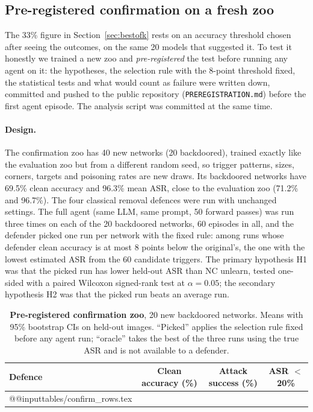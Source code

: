 \documentclass[11pt]{article}
\makeatletter
\newcommand{\tabin}[1]{\csname @@input\endcsname tables/#1 }
\makeatother
\begin{document}
\subsection{Pre-registered confirmation on a fresh zoo}
\label{sec:confirm}
The 33\% figure in Section~\ref{sec:bestofk} rests on an accuracy threshold chosen after seeing the
outcomes, on the same 20 models that suggested it. To test it honestly we trained a new zoo and
\emph{pre-registered} the test before running any agent on it: the hypotheses, the selection rule with
the 8-point threshold fixed, the statistical tests and what would count as failure were written down,
committed and pushed to the public repository (\texttt{PREREGISTRATION.md}) before the first agent
episode. The analysis script was committed at the same time.

\paragraph{Design.} The confirmation zoo has 40 new networks (20 backdoored), trained exactly like the
evaluation zoo but from a different random seed, so trigger patterns, sizes, corners, targets and
poisoning rates are new draws. Its backdoored networks have 69.5\% clean accuracy and 96.3\% mean ASR,
close to the evaluation zoo (71.2\% and 96.7\%). The four classical removal defences were run with
unchanged settings. The full agent (same LLM, same prompt, 50 forward passes) was run three times on each
of the 20 backdoored networks, 60 episodes in all, and the defender picked one run per network with the
fixed rule: among runs whose defender clean accuracy is at most 8 points below the original's, the one
with the lowest estimated ASR from the 60 candidate triggers. The primary hypothesis H1 was that the
picked run has lower held-out ASR than NC unlearn, tested one-sided with a paired Wilcoxon signed-rank
test at $\alpha = 0.05$; the secondary hypothesis H2 was that the picked run beats an average run.

\begin{table}[!htb]
  \centering
  \caption{\textbf{Pre-registered confirmation zoo}, 20 new backdoored networks. Means with 95\% bootstrap
  CIs on held-out images. ``Picked'' applies the selection rule fixed before any agent run; ``oracle''
  takes the best of the three runs using the true ASR and is not available to a defender.}
  \label{tab:confirm}
  \small
  \begin{tabular}{lccc}
    \toprule
    Defence & Clean accuracy (\%) & Attack success (\%) & ASR $<$ 20\% \\
    \midrule
    \tabin{confirm_rows.tex}
    \bottomrule
  \end{tabular}
\end{table}
\end{document}
